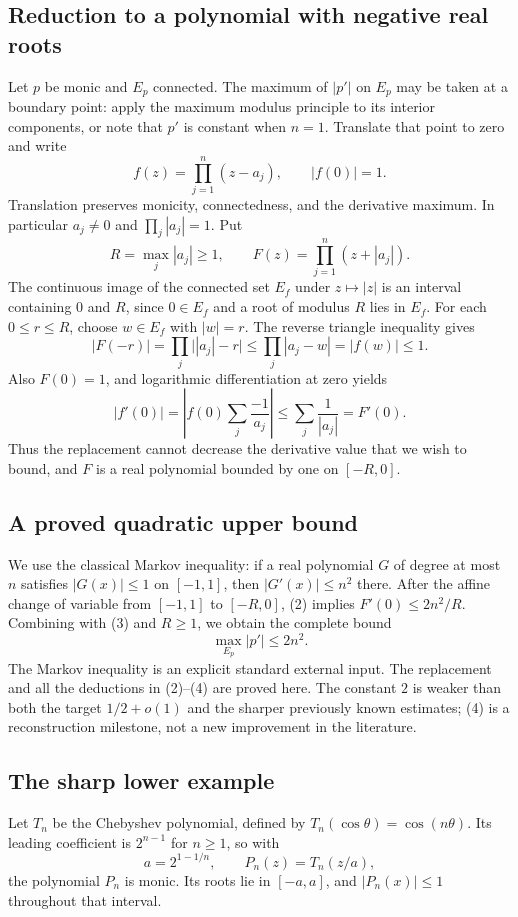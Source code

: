 \subsection{Reduction to a polynomial with negative real roots}
Let $p$ be monic and $E_p$ connected. The maximum of $|p'|$ on $E_p$ may be taken at a boundary point: apply the maximum modulus principle to its interior components, or note that $p'$ is constant when $n=1$. Translate that point to zero and write
\[
f(z)=\prod_{j=1}^n(z-a_j),\qquad |f(0)|=1.
\]
Translation preserves monicity, connectedness, and the derivative maximum. In particular $a_j\ne0$ and $\prod_j|a_j|=1$. Put
\[
R=\max_j|a_j|\geq1,\qquad F(z)=\prod_{j=1}^n(z+|a_j|).
\]
The continuous image of the connected set $E_f$ under $z\mapsto|z|$ is an interval containing $0$ and $R$, since $0\in E_f$ and a root of modulus $R$ lies in $E_f$. For each $0\leq r\leq R$, choose $w\in E_f$ with $|w|=r$. The reverse triangle inequality gives
\[
|F(-r)|=\prod_j\bigl||a_j|-r\bigr|
\leq\prod_j|a_j-w|=|f(w)|\leq1.
\tag{2}
\]
Also $F(0)=1$, and logarithmic differentiation at zero yields
\[
|f'(0)|=\left|f(0)\sum_j\frac{-1}{a_j}\right|
\leq\sum_j\frac1{|a_j|}=F'(0).
\tag{3}
\]
Thus the replacement cannot decrease the derivative value that we wish to bound, and $F$ is a real polynomial bounded by one on $[-R,0]$.

\subsection{A proved quadratic upper bound}
We use the classical Markov inequality: if a real polynomial $G$ of degree at most $n$ satisfies $|G(x)|\leq1$ on $[-1,1]$, then $|G'(x)|\leq n^2$ there. After the affine change of variable from $[-1,1]$ to $[-R,0]$, (2) implies $F'(0)\leq2n^2/R$. Combining with (3) and $R\geq1$, we obtain the complete bound
\[
\max_{E_p}|p'|\leq2n^2.
\tag{4}
\]
The Markov inequality is an explicit standard external input. The replacement and all the deductions in (2)--(4) are proved here. The constant $2$ is weaker than both the target $1/2+o(1)$ and the sharper previously known estimates; (4) is a reconstruction milestone, not a new improvement in the literature.

\subsection{The sharp lower example}
Let $T_n$ be the Chebyshev polynomial, defined by $T_n(\cos\theta)=\cos(n\theta)$. Its leading coefficient is $2^{n-1}$ for $n\geq1$, so with
\[
a=2^{1-1/n},\qquad P_n(z)=T_n(z/a),
\]
the polynomial $P_n$ is monic. Its roots lie in $[-a,a]$, and $|P_n(x)|\leq1$ throughout that interval.

